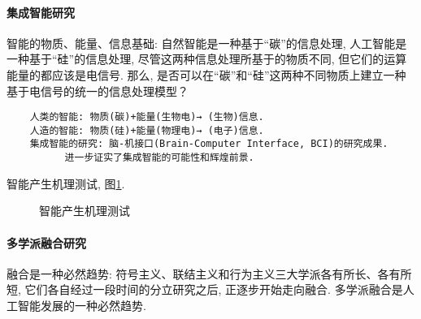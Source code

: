 \paragraph{集成智能研究}

智能的物质、能量、信息基础: 自然智能是一种基于“碳”的信息处理, 人工智能是一种基于“硅”的信息处理, 尽管这两种信息处理所基于的物质不同, 但它们的运算能量的都应该是电信号. 那么, 是否可以在“碳”和“硅”这两种不同物质上建立一种基于电信号的统一的信息处理模型？
\begin{Verbatim}
    人类的智能: 物质(碳)+能量(生物电)→ (生物)信息.
    人造的智能: 物质(硅)+能量(物理电)→ (电子)信息.
    集成智能的研究: 脑-机接口(Brain-Computer Interface, BCI)的研究成果.
          进一步证实了集成智能的可能性和辉煌前景.
\end{Verbatim}
智能产生机理测试, 图\ref{AItest2020012801}.
\begin{figure}[htbp]
\begin{center}
\end{center}
\caption{智能产生机理测试}
\label{AItest2020012801}
\end{figure}
\paragraph{多学派融合研究}

融合是一种必然趋势: 符号主义、联结主义和行为主义三大学派各有所长、各有所短, 它们各自经过一段时间的分立研究之后, 正逐步开始走向融合. 多学派融合是人工智能发展的一种必然趋势.

